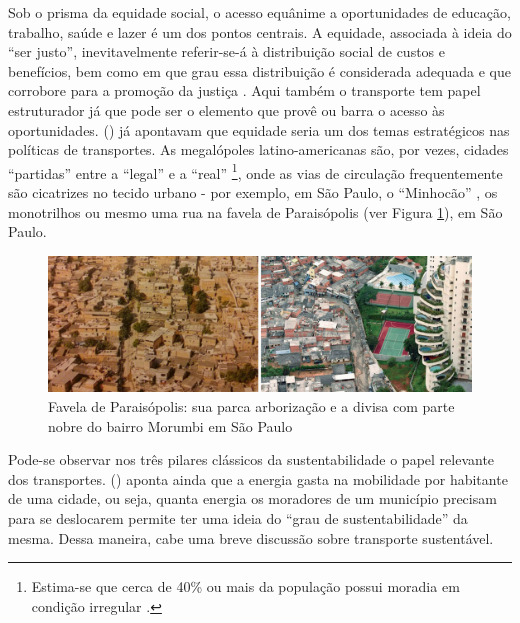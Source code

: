 Sob o prisma da equidade social, o acesso equânime a oportunidades de educação, trabalho, saúde e lazer é um dos pontos centrais. A equidade, associada à ideia do ``ser justo'', inevitavelmente referir-se-á à distribuição social de custos e benefícios, bem como em que grau essa distribuição é considerada adequada e que corrobore para a promoção da justiça \cite{LITMAN2006}. Aqui também o transporte tem papel estruturador já que pode ser o elemento que provê ou barra o acesso às oportunidades.  (\citeyear{SANCHEZ2003}) já apontavam que equidade seria um dos temas estratégicos nas políticas de transportes. As megalópoles latino-americanas são, por vezes, cidades ``partidas'' \cite{VENTURA2001} entre a ``legal'' e a ``real'' \cite{ALVA1997}
\footnote{Estima-se que cerca de 40\% ou mais da população possui moradia em condição irregular \cite{FREITAG2007}.},
onde as vias de circulação frequentemente são cicatrizes no tecido urbano - por exemplo, em São Paulo, o ``Minhocão'' \cite{ABASCAL2010}, os monotrilhos \cite{ROLNIK2010} ou mesmo uma rua na favela de Paraisópolis (ver Figura \ref{fig:paraisopolis}), em São Paulo.

\begin{figure}[htb]%
    \caption{\label{fig:paraisopolis}Favela de Paraisópolis: sua parca arborização e a divisa com parte nobre do bairro Morumbi em São Paulo}%
    \begin{center}%
        \includegraphics[width=1.0\textwidth]{./imagens/paraisopolis.jpg}%
    \end{center}%
\end{figure}%

Pode-se observar nos três pilares clássicos da sustentabilidade o papel relevante dos transportes.  (\citeyear{VASCONCELLOS2012}) aponta ainda que a energia gasta na mobilidade por habitante de uma cidade, ou seja, quanta energia os moradores de um município precisam para se deslocarem permite ter uma ideia do ``grau de sustentabilidade'' da mesma. Dessa maneira, cabe uma breve discussão sobre transporte sustentável.

